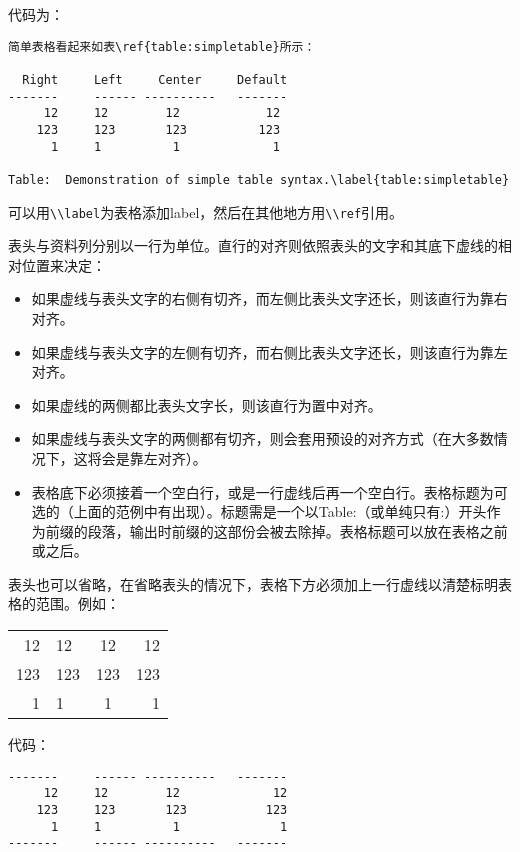 \documentclass[fancyhdr,bookmark]{ctexbook}
\providecommand{\tightlist}{%
  \setlength{\itemsep}{0pt}\setlength{\parskip}{0pt}}
\newcommand{\passthrough}[1]{#1}
\begin{document}
代码为：

\begin{lstlisting}
简单表格看起来如表\ref{table:simpletable}所示：

  Right     Left     Center     Default
-------     ------ ----------   -------
     12     12        12            12
    123     123       123          123
      1     1          1             1

Table:  Demonstration of simple table syntax.\label{table:simpletable}
\end{lstlisting}

可以用\passthrough{\lstinline!\\label!}为表格添加label，然后在其他地方用\passthrough{\lstinline!\\ref!}引用。

表头与资料列分别以一行为单位。直行的对齐则依照表头的文字和其底下虚线的相对位置来决定：

\begin{itemize}
\tightlist
\item
  如果虚线与表头文字的右侧有切齐，而左侧比表头文字还长，则该直行为靠右对齐。
\item
  如果虚线与表头文字的左侧有切齐，而右侧比表头文字还长，则该直行为靠左对齐。
\item
  如果虚线的两侧都比表头文字长，则该直行为置中对齐。
\item
  如果虚线与表头文字的两侧都有切齐，则会套用预设的对齐方式（在大多数情况下，这将会是靠左对齐）。
\item
  表格底下必须接着一个空白行，或是一行虚线后再一个空白行。表格标题为可选的（上面的范例中有出现）。标题需是一个以Table:（或单纯只有:）开头作为前缀的段落，输出时前缀的这部份会被去除掉。表格标题可以放在表格之前或之后。
\end{itemize}

表头也可以省略，在省略表头的情况下，表格下方必须加上一行虚线以清楚标明表格的范围。例如：

\begin{longtable}[]{@{}rlcr@{}}
\toprule
\endhead
12 & 12 & 12 & 12\tabularnewline
123 & 123 & 123 & 123\tabularnewline
1 & 1 & 1 & 1\tabularnewline
\bottomrule
\end{longtable}

代码：

\begin{lstlisting}
-------     ------ ----------   -------
     12     12        12             12
    123     123       123           123
      1     1          1              1
-------     ------ ----------   -------
\end{lstlisting}
\end{document}
